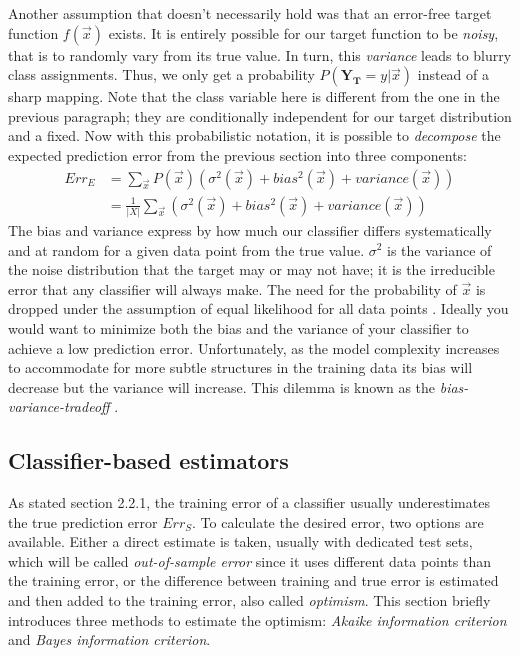 Another assumption that doesn't necessarily hold was that an error-free target function $f(\vec{x})$ exists. It is entirely possible for our target function to be \textit{noisy}, that is to randomly vary from its true value. In turn, this \textit{variance} leads to blurry class assignments. Thus, we only get a probability $P(\mathbf{Y_T} = y | \vec{x})$ instead of a sharp mapping. Note that the class variable here is different from the one in the previous paragraph; they are conditionally independent for our target distribution and a fixed. Now with this probabilistic notation, it is possible to \textit{decompose} the expected prediction error from the previous section into three components:
\begin{equation}
\begin{split}
Err_{E} &= \sum_{\vec{x}}^{}P(\vec{x})\left(\sigma^2(\vec{x}) + bias^2(\vec{x}) + variance(\vec{x})\right) \\
&= \frac{1}{|X|}\sum_{\vec{x}}^{}\left(\sigma^2(\vec{x}) + bias^2(\vec{x}) + variance(\vec{x})\right)
\end{split}
\end{equation}
The bias and variance express by how much our classifier differs systematically and at random for a given data point from the true value. $\sigma^2$ is the variance of the noise distribution that the target may or may not have; it is the irreducible error that any classifier will always make. The need for the probability of $\vec{x}$ is dropped under the assumption of equal likelihood for all data points \cite{KohaviEtAl1996}. Ideally you would want to minimize both the bias and the variance of your classifier to achieve a low prediction error. Unfortunately, as the model complexity increases to accommodate for more subtle structures in the training data its bias will decrease but the variance will increase. This dilemma is known as the \textit{bias-variance-tradeoff} \cite{KroghVedelsby1995}.

\subsection{Classifier-based estimators}
As stated section 2.2.1, the training error of a classifier usually underestimates the true prediction error $Err_S$. To calculate the desired error, two options are available. Either a direct estimate is taken, usually with dedicated test sets, which will be called \textit{out-of-sample error} since it uses different data points than the training error, or the difference between training and true error is estimated and then added to the training error, also called \textit{optimism}. This section briefly introduces three methods to estimate the optimism: \textit{Akaike information criterion} and \textit{Bayes information criterion}.

